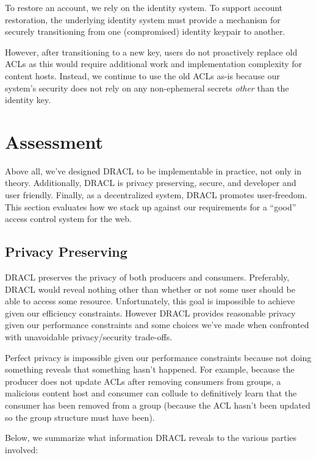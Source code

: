 \documentclass[pdftex,12pt,a4papaer,twoside,notitlepage]{report}
\begin{document}
To restore an account, we rely on the identity system. To support account
restoration, the underlying identity system must provide a mechanism for
securely transitioning from one (compromised) identity keypair to another.

However, after transitioning to a new key, users do not proactively replace old
ACLs as this would require additional work and implementation complexity for
content hosts. Instead, we continue to use the old ACLs as-is because our
system's security does not rely on any non-ephemeral secrets \emph{other} than
the identity key.

\chapter{Assessment}

Above all, we've designed DRACL to be implementable in practice, not only in
theory. Additionally, DRACL is privacy preserving, secure, and developer and
user friendly. Finally, as a decentralized system, DRACL promotes user-freedom.
This section evaluates how we stack up against our requirements for a ``good''
access control system for the web.

\section{Privacy Preserving}
\label{sec:privacy}

DRACL preserves the privacy of both producers and consumers. Preferably, DRACL
would reveal nothing other than whether or not some user should be able to
access some resource. Unfortunately, this goal is impossible to achieve given
our efficiency constraints. However DRACL provides reasonable privacy given our
performance constraints and some choices we've made when confronted with
unavoidable privacy/security trade-offs.

Perfect privacy is impossible given our performance constraints because not
doing something reveals that something hasn't happened. For example, because the
producer does not update ACLs after removing consumers from groups, a malicious
content host and consumer can collude to definitively learn that the consumer
has been removed from a group (because the ACL hasn't been updated so the group
structure must have been).

Below, we summarize what information DRACL reveals to the various parties involved:
\end{document}
